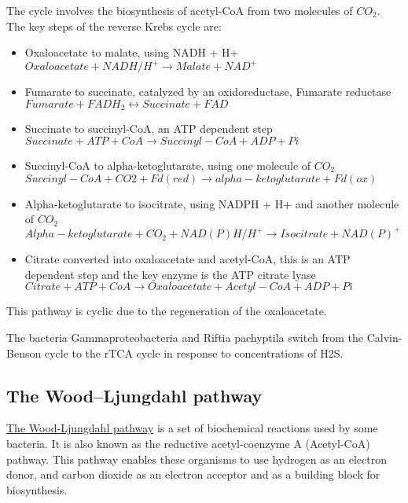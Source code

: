 \documentclass{article}
\begin{document}
The cycle involves the biosynthesis of acetyl-CoA from two molecules of $CO_2$. The key
steps of the reverse Krebs cycle are:

\begin{itemize}

    \item Oxaloacetate to malate, using NADH + H+\\
        $Oxaloacetate + NADH / H^+ \rightarrow Malate + NAD^+$
    \item Fumarate to succinate, catalyzed by an oxidoreductase, Fumarate
        reductase\\
        $Fumarate + FADH_2 \leftrightarrow Succinate + FAD$
    \item Succinate to succinyl-CoA, an ATP dependent step\\
        $Succinate + ATP + CoA \rightarrow Succinyl-CoA + ADP + Pi$
    \item Succinyl-CoA to alpha-ketoglutarate, using one molecule of $CO_2$\\
        $Succinyl-CoA + CO2 + Fd{(red)} \rightarrow alpha-ketoglutarate + Fd{(ox)}$
    \item Alpha-ketoglutarate to isocitrate, using NADPH + H+ and another molecule of
        $CO_2$\\
        $Alpha-ketoglutarate + CO_2 + NAD(P)H/H^+ \rightarrow Isocitrate + NAD{(P)}^+$
    \item Citrate converted into oxaloacetate and acetyl-CoA, this is an ATP
        dependent step and the key enzyme is the ATP citrate lyase\\
        $Citrate + ATP + CoA \rightarrow Oxaloacetate + Acetyl-CoA + ADP + Pi$
\end{itemize}

This pathway is cyclic due to the regeneration of the oxaloacetate.

The bacteria Gammaproteobacteria and Riftia pachyptila switch from the Calvin-Benson cycle
to the rTCA cycle in response to concentrations of H2S.

\subsection{The Wood–Ljungdahl pathway}
\href{https://en.wikipedia.org/wiki/Wood-Ljungdahl_pathway}{The Wood-Ljungdahl pathway} is
a set of biochemical reactions used by some bacteria. It is
also known as the reductive acetyl-coenzyme A (Acetyl-CoA) pathway. This pathway
enables these organisms to use hydrogen as an electron donor, and carbon dioxide as an
electron acceptor and as a building block for biosynthesis.
\end{document}

